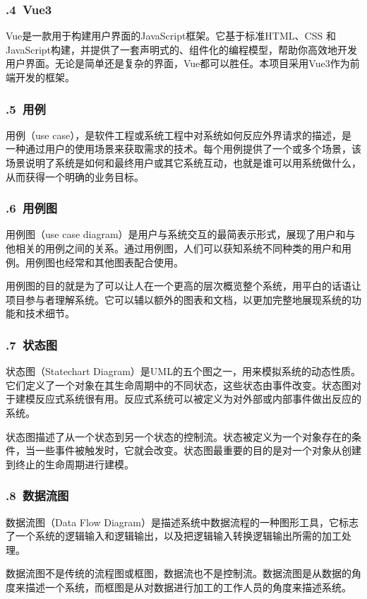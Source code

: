 \documentclass[24pt,a4paper]{article}%
\begin{document}
\subsubsection*{.4\ Vue3}
Vue是一款用于构建用户界面的JavaScript框架。它基于标准HTML、CSS 和JavaScript构建，并提供了一套声明式的、组件化的编程模型，帮助你高效地开发用户界面。无论是简单还是复杂的界面，Vue都可以胜任。本项目采用Vue3作为前端开发的框架。
\subsubsection*{.5\ 用例}
用例（use case），是软件工程或系统工程中对系统如何反应外界请求的描述，是一种通过用户的使用场景来获取需求的技术。每个用例提供了一个或多个场景，该场景说明了系统是如何和最终用户或其它系统互动，也就是谁可以用系统做什么，从而获得一个明确的业务目标。
\subsubsection*{.6\ 用例图}
用例图（use case diagram）是用户与系统交互的最简表示形式，展现了用户和与他相关的用例之间的关系。通过用例图，人们可以获知系统不同种类的用户和用例。用例图也经常和其他图表配合使用。\par
用例图的目的就是为了可以让人在一个更高的层次概览整个系统，用平白的话语让项目参与者理解系统。它可以辅以额外的图表和文档，以更加完整地展现系统的功能和技术细节。
\subsubsection*{.7\ 状态图}
状态图（Statechart Diagram）是UML的五个图之一，用来模拟系统的动态性质。它们定义了一个对象在其生命周期中的不同状态，这些状态由事件改变。状态图对于建模反应式系统很有用。反应式系统可以被定义为对外部或内部事件做出反应的系统。\par
状态图描述了从一个状态到另一个状态的控制流。状态被定义为一个对象存在的条件，当一些事件被触发时，它就会改变。状态图最重要的目的是对一个对象从创建到终止的生命周期进行建模。
\subsubsection*{.8\ 数据流图}
数据流图（Data Flow Diagram）是描述系统中数据流程的一种图形工具，它标志了一个系统的逻辑输入和逻辑输出，以及把逻辑输入转换逻辑输出所需的加工处理。\par
数据流图不是传统的流程图或框图，数据流也不是控制流。数据流图是从数据的角度来描述一个系统，而框图是从对数据进行加工的工作人员的角度来描述系统。
\end{document}

